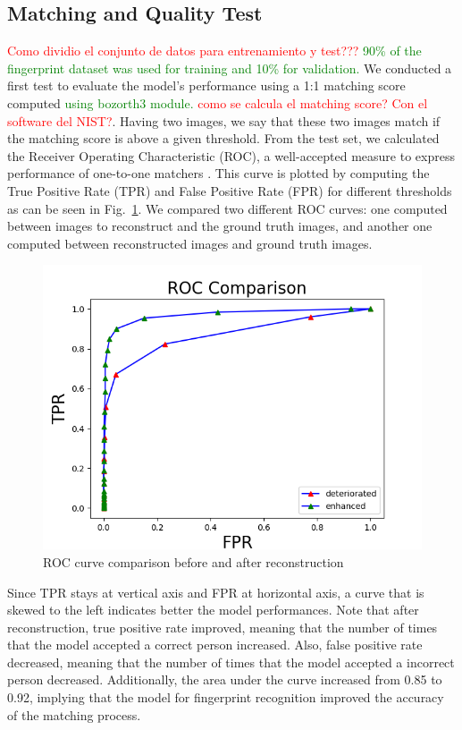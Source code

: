 \documentclass[a4paper,fleqn]{cas-dc}
\begin{document}
\subsection{Matching and Quality Test}
\textcolor{red}{Como dividio el conjunto de datos para entrenamiento y test???} \textcolor{green}{90\% of the fingerprint dataset was used for training and 10\% for validation.} We conducted a first test to evaluate the model's performance using a 1:1 matching score computed \textcolor{green}{ using bozorth3 module.} \textcolor{red}{como se calcula el matching score? Con el software del NIST?}. Having two images, we say that these two images match if the matching score is above a given threshold. From the test set, we calculated the Receiver Operating Characteristic (ROC), a well-accepted measure to express performance of one-to-one matchers \cite{RROCCMC}. This curve is plotted by computing the True Positive Rate (TPR) and False Positive Rate (FPR) for different thresholds as can be seen in Fig.~\ref{fig9}. We compared two different ROC curves: one computed between images to reconstruct and the ground truth images, and another one computed between reconstructed images and ground truth images. 
\begin{figure}[!ht]
\centerline{\includegraphics[scale=0.5]{figs/roc_comparison.png}}
\caption{ROC curve comparison before and after reconstruction}
\label{fig9}
\end{figure}
Since TPR stays at vertical axis and FPR at horizontal axis, a curve that is skewed to the left indicates better the model performances. Note that after reconstruction, true positive rate improved, meaning that the number of times that the model accepted a correct person increased. Also, false positive rate decreased,  meaning that the number of times that the model accepted a incorrect person decreased. Additionally, the area under the curve increased from 0.85 to 0.92, implying that the model for fingerprint recognition improved the accuracy of the matching process.
\end{document}
